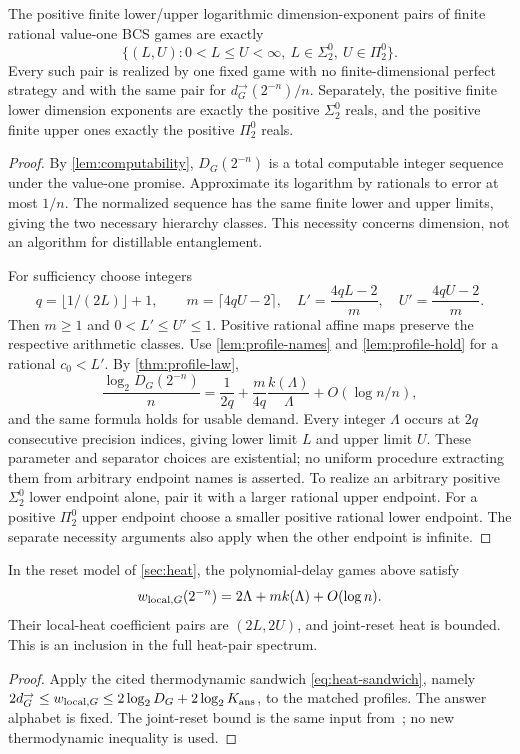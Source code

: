 \begin{theorem}\label{thm:profile-pairs}
The positive finite lower/upper logarithmic dimension-exponent pairs of finite rational value-one BCS games are exactly
\begin{equation}\label{eq:profile-pair-class}
 \{(L,U):0<L\le U<\infty,\ L\in\Sigma^0_2,\ U\in\Pi^0_2\}.
\end{equation}
Every such pair is realized by one fixed game with no finite-dimensional perfect strategy and with the same pair for $d_G^\to(2^{-n})/n$. Separately, the positive finite lower dimension exponents are exactly the positive $\Sigma^0_2$ reals, and the positive finite upper ones exactly the positive $\Pi^0_2$ reals.
\end{theorem}
\begin{proof}
By \cref{lem:computability}, $D_G(2^{-n})$ is a total computable integer sequence under the value-one promise. Approximate its logarithm by rationals to error at most $1/n$. The normalized sequence has the same finite lower and upper limits, giving the two necessary hierarchy classes. This necessity concerns dimension, not an algorithm for distillable entanglement.

For sufficiency choose integers
\[
 q=\lfloor1/(2L)\rfloor+1,\qquad m=\lceil4qU-2\rceil,
 \quad L'=\frac{4qL-2}{m},\quad U'=\frac{4qU-2}{m}.
\]
Then $m\ge1$ and $0<L'\le U'\le1$. Positive rational affine maps preserve the respective arithmetic classes. Use \cref{lem:profile-names} and \cref{lem:profile-hold} for a rational $c_0<L'$. By \cref{thm:profile-law},
\[
 \frac{\log_2D_G(2^{-n})}{n}
 =\frac1{2q}+\frac m{4q}\frac{k(\Lambda)}\Lambda+O(\log n/n),
\]
and the same formula holds for usable demand. Every integer $\Lambda$ occurs at $2q$ consecutive precision indices, giving lower limit $L$ and upper limit $U$. These parameter and separator choices are existential; no uniform procedure extracting them from arbitrary endpoint names is asserted. To realize an arbitrary positive $\Sigma^0_2$ lower endpoint alone, pair it with a larger rational upper endpoint. For a positive $\Pi^0_2$ upper endpoint choose a smaller positive rational lower endpoint. The separate necessity arguments also apply when the other endpoint is infinite.
\end{proof}

\begin{corollary}\label{cor:profile-heat}
In the reset model of \cref{sec:heat}, the polynomial-delay games above satisfy
\[
 w_{{\rm local},G}(2^{-n})=2\Lambda+mk(\Lambda)+O(\log n).
\]
Their local-heat coefficient pairs are $(2L,2U)$, and joint-reset heat is bounded. This is an inclusion in the full heat-pair spectrum.
\end{corollary}
\begin{proof}
Apply the cited thermodynamic sandwich \eqref{eq:heat-sandwich}, namely
$2d_G^\to\le w_{{\rm local},G}\le2\log_2D_G+2\log_2K_{\rm ans}$, to the matched profiles. The answer alphabet is fixed. The joint-reset bound is the same input from~\cite[Theorem~2.1]{DM-heat}; no new thermodynamic inequality is used.
\end{proof}

